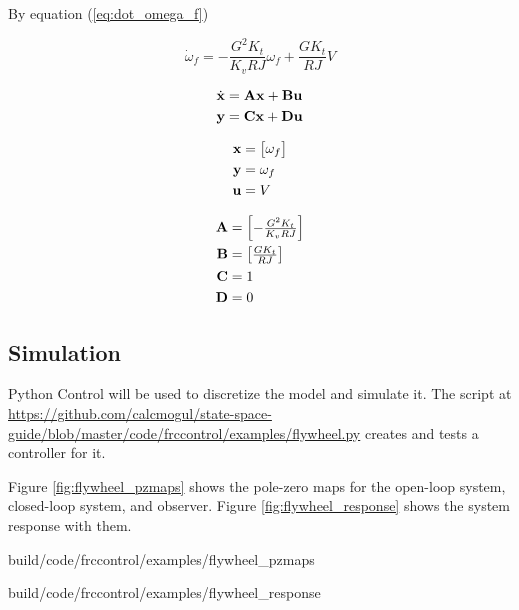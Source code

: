 By equation (\ref{eq:dot_omega_f})

\begin{equation*}
  \dot{\omega}_f = -\frac{G^2 K_t}{K_v RJ} \omega_f + \frac{G K_t}{RJ} V
\end{equation*}

\begin{align*}
  \dot{\mathbf{x}} &= \mathbf{A} \mathbf{x} + \mathbf{B} \mathbf{u} \\
  \mathbf{y} &= \mathbf{C} \mathbf{x} + \mathbf{D} \mathbf{u}
\end{align*}

\begin{align*}
  \mathbf{x} &=
  \begin{bmatrix}
    \omega_f
  \end{bmatrix} \\
  \mathbf{y} &= \omega_f \\
  \mathbf{u} &= V
\end{align*}

\begin{align}
  \mathbf{A} &=
  \begin{bmatrix}
    -\frac{G^2 K_t}{K_v RJ}
  \end{bmatrix} \\
  \mathbf{B} &=
  \begin{bmatrix}
    \frac{G K_t}{RJ}
  \end{bmatrix} \\
  \mathbf{C} &= 1 \\
  \mathbf{D} &= 0
\end{align}

\subsection{Simulation}

Python Control will be used to discretize the model and simulate it. The script
at
\url{https://github.com/calcmogul/state-space-guide/blob/master/code/frccontrol/examples/flywheel.py}
creates and tests a controller for it.

Figure \ref{fig:flywheel_pzmaps} shows the pole-zero maps for the open-loop
system, closed-loop system, and observer. Figure \ref{fig:flywheel_response}
shows the system response with them.

\begin{svg}{build/code/frccontrol/examples/flywheel_pzmaps}
  \caption{Flywheel pole-zero maps}
  \label{fig:flywheel_pzmaps}
\end{svg}

\begin{svg}{build/code/frccontrol/examples/flywheel_response}
  \caption{Flywheel response}
  \label{fig:flywheel_response}
\end{svg}
